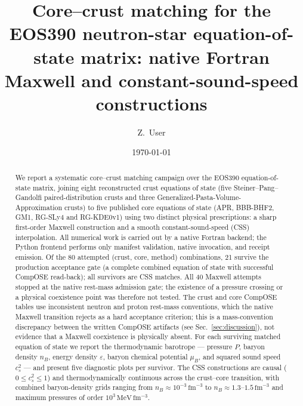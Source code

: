 \documentclass[aps,prc,reprint,notitlepage]{revtex4-2}
\newcommand{\fmthree}{\,\mathrm{fm}^{-3}}
\begin{document}
\title{Core--crust matching for the EOS390 neutron-star equation-of-state matrix: native Fortran Maxwell and constant-sound-speed constructions}

\author{Z.~User}

\date{\today}

\begin{abstract}
We report a systematic core--crust matching campaign over the EOS390
equation-of-state matrix, joining eight reconstructed crust equations of
state (five Steiner--Pang--Gandolfi paired-distribution crusts and three
Generalized-Pasta-Volume-Approximation crusts) to five published core
equations of state (APR, BBB-BHF2, GM1, RG-SLy4 and RG-KDE0v1) using two
distinct physical prescriptions: a sharp first-order Maxwell construction
and a smooth constant-sound-speed (CSS) interpolation.  All numerical work
is carried out by a native Fortran backend; the Python frontend performs
only manifest validation, native invocation, and receipt emission.  Of the
80 attempted (crust, core, method) combinations, 21 survive the production
acceptance gate (a complete combined equation of state with successful
CompOSE read-back); all survivors are CSS matches.  All 40 Maxwell
attempts stopped at the native rest-mass admission gate; the existence of
a pressure crossing or a physical coexistence point was therefore not
tested.  The crust and core CompOSE tables use inconsistent neutron and
proton rest-mass conventions, which the native Maxwell transition rejects
as a hard acceptance criterion; this is a mass-convention discrepancy
between the written CompOSE artifacts (see
Sec.~\ref{sec:discussion}), not evidence that a Maxwell
coexistence is physically absent.  For each surviving matched equation of
state we report the thermodynamic barotrope --- pressure $P$, baryon
density $n_B$, energy density $\varepsilon$, baryon chemical potential
$\mu_B$, and squared sound speed $c_s^2$ --- and present five diagnostic
plots per survivor.  The CSS constructions are causal ($0 \le c_s^2 \le 1$)
and thermodynamically continuous across the crust--core transition, with
combined baryon-density grids ranging from $n_B \approx 10^{-3}\fmthree$ to
$n_B \approx 1.3$--$1.5\fmthree$ and maximum pressures of order
$10^3\,\mathrm{MeV\,fm^{-3}}$.
\end{abstract}

\maketitle
\end{document}
